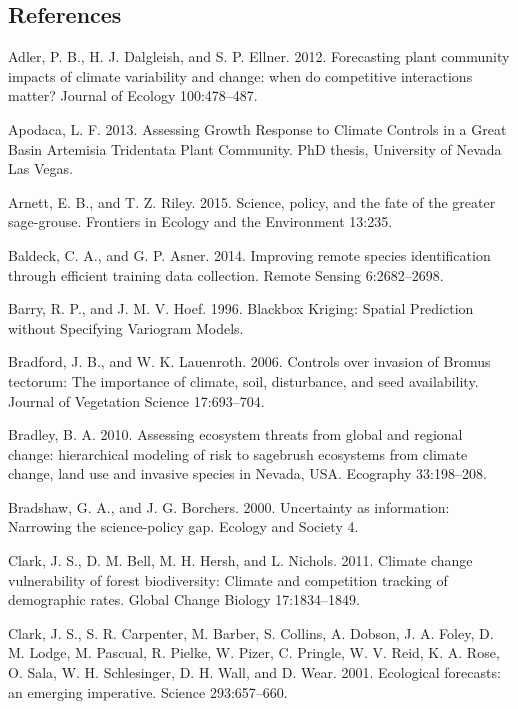 \documentclass[12pt,]{article}
\begin{document}
\newpage{}

\subsection*{References}\label{references}

\hypertarget{refs}{}
\hypertarget{ref-Adler2012}{}
Adler, P. B., H. J. Dalgleish, and S. P. Ellner. 2012. Forecasting plant
community impacts of climate variability and change: when do competitive
interactions matter? Journal of Ecology 100:478--487.

\hypertarget{ref-Apodaca2013}{}
Apodaca, L. F. 2013. Assessing Growth Response to Climate Controls in a
Great Basin Artemisia Tridentata Plant Community. PhD thesis, University
of Nevada Las Vegas.

\hypertarget{ref-Arnett2015}{}
Arnett, E. B., and T. Z. Riley. 2015. Science, policy, and the fate of
the greater sage-grouse. Frontiers in Ecology and the Environment
13:235.

\hypertarget{ref-Baldeck2014}{}
Baldeck, C. A., and G. P. Asner. 2014. Improving remote species
identification through efficient training data collection. Remote
Sensing 6:2682--2698.

\hypertarget{ref-Barry1996}{}
Barry, R. P., and J. M. V. Hoef. 1996. Blackbox Kriging: Spatial
Prediction without Specifying Variogram Models.

\hypertarget{ref-Bradford2006}{}
Bradford, J. B., and W. K. Lauenroth. 2006. Controls over invasion of
Bromus tectorum: The importance of climate, soil, disturbance, and seed
availability. Journal of Vegetation Science 17:693--704.

\hypertarget{ref-Bradley2010}{}
Bradley, B. A. 2010. Assessing ecosystem threats from global and
regional change: hierarchical modeling of risk to sagebrush ecosystems
from climate change, land use and invasive species in Nevada, USA.
Ecography 33:198--208.

\hypertarget{ref-Bradshaw2000}{}
Bradshaw, G. A., and J. G. Borchers. 2000. Uncertainty as information:
Narrowing the science-policy gap. Ecology and Society 4.

\hypertarget{ref-Clark2011}{}
Clark, J. S., D. M. Bell, M. H. Hersh, and L. Nichols. 2011. Climate
change vulnerability of forest biodiversity: Climate and competition
tracking of demographic rates. Global Change Biology 17:1834--1849.

\hypertarget{ref-Clark2001}{}
Clark, J. S., S. R. Carpenter, M. Barber, S. Collins, A. Dobson, J. A.
Foley, D. M. Lodge, M. Pascual, R. Pielke, W. Pizer, C. Pringle, W. V.
Reid, K. A. Rose, O. Sala, W. H. Schlesinger, D. H. Wall, and D. Wear.
2001. Ecological forecasts: an emerging imperative. Science
293:657--660.
\end{document}
